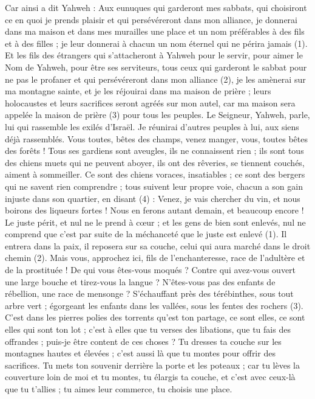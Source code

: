\begin{multicols}{2}
Car ainsi a dit Yahweh : Aux eunuques qui garderont mes sabbats, qui choisiront ce en quoi je prends plaisir et qui persévéreront dans mon alliance,
je donnerai dans ma maison et dans mes murailles une place et un nom préférables à des fils et à des filles ; je leur donnerai à chacun un nom éternel qui ne périra jamais (1).
Et les fils des étrangers qui s’attacheront à Yahweh pour le servir, pour aimer le Nom de Yahweh, pour être ses serviteurs, tous ceux qui garderont le sabbat pour ne pas le profaner et qui persévéreront dans mon alliance (2),
je les amènerai sur ma montagne sainte, et je les réjouirai dans ma maison de prière ; leurs holocaustes et leurs sacrifices seront agréés sur mon autel, car ma maison sera appelée la maison de prière (3) pour tous les peuples.
Le Seigneur, Yahweh, parle, lui qui rassemble les exilés d'Israël. Je réunirai d’autres peuples à lui, aux siens déjà rassemblés.
Vous toutes, bêtes des champs, venez manger, vous, toutes bêtes des forêts !
Tous ses gardiens sont aveugles, ils ne connaissent rien ; ils sont tous des chiens muets qui ne peuvent aboyer, ils ont des rêveries, se tiennent couchés, aiment à sommeiller.
Ce sont des chiens voraces, insatiables ; ce sont des bergers qui ne savent rien comprendre ; tous suivent leur propre voie, chacun a son gain injuste dans son quartier, en disant (4) :
Venez, je vais chercher du vin, et nous boirons des liqueurs fortes ! Nous en ferons autant demain, et beaucoup encore !
\VerseOne{}Le juste périt, et nul ne le prend à cœur ; et les gens de bien sont enlevés, nul ne comprend que c’est par suite de la méchanceté que le juste est enlevé (1).
Il entrera dans la paix, il reposera sur sa couche, celui qui aura marché dans le droit chemin (2).
Mais vous, approchez ici, fils de l’enchanteresse, race de l’adultère et de la prostituée !
De qui vous êtes-vous moqués ? Contre qui avez-vous ouvert une large bouche et tirez-vous la langue ? N'êtes-vous pas des enfants de rébellion, une race de mensonge ?
S’échauffant près des térébinthes, sous tout arbre vert ; égorgeant les enfants dans les vallées, sous les fentes des rochers (3).
C’est dans les pierres polies des torrents qu’est ton partage, ce sont elles, ce sont elles qui sont ton lot ; c’est à elles que tu verses des libations, que tu fais des offrandes ; puis-je être content de ces choses ?
Tu dresses ta couche sur les montagnes hautes et élevées ; c’est aussi là que tu montes pour offrir des sacrifices.
Tu mets ton souvenir derrière la porte et les poteaux ; car tu lèves la couverture loin de moi et tu montes, tu élargis ta couche, et c’est avec ceux-là que tu t’allies ; tu aimes leur commerce, tu choisis une place.

\end{multicols}
